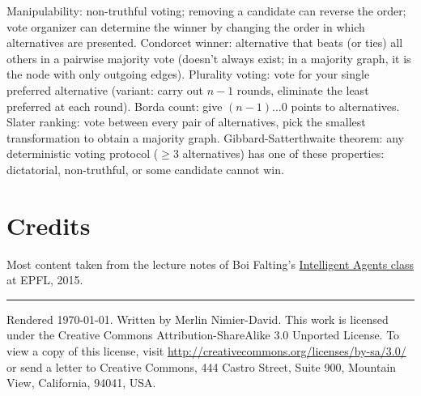 \documentclass[10pt,a4paper,landscape]{article}
\newcommand{\concept}[1]{\textcolor{Emerald}{#1}} %
\begin{document}
\begin{multicols*}{4}
\concept{Manipulability}: non-truthful voting; removing a candidate can reverse the order; vote organizer can determine the winner by changing the order in which alternatives are presented.
\concept{Condorcet winner}: alternative that beats (or ties) all others in a pairwise majority vote (doesn't always exist; in a majority graph, it is the node with only outgoing edges).
\concept{Plurality voting}: vote for your single preferred alternative (variant: carry out $n - 1$ rounds, eliminate the least preferred at each round).
\concept{Borda count}: give $(n - 1) \dots 0$ points to alternatives.
\concept{Slater ranking}: vote between every pair of alternatives, pick the smallest transformation to obtain a majority graph.
\concept{Gibbard-Satterthwaite theorem}: any deterministic voting protocol ($\geq 3$ alternatives) has one of these properties: dictatorial, non-truthful, or some candidate cannot win.

\newpage



\section{Credits}
Most content taken from the lecture notes of Boi Falting's \href{http://edu.epfl.ch/coursebook/en/intelligent-agents-CS-430}{Intelligent Agents class} at EPFL, 2015.

\vspace{0.5cm}
\hrule
\vspace{0.5cm}
\tiny
Rendered \today. Written by Merlin Nimier-David.
This work is licensed under the Creative Commons Attribution-ShareAlike 3.0 Unported License.
To view a copy of this license, visit \href{http://creativecommons.org/licenses/by-sa/3.0/}{http://creativecommons.org/licenses/by-sa/3.0/} or
send a letter to Creative Commons, 444 Castro Street, Suite 900, Mountain View, California, 94041, USA.
\end{multicols*}
\end{document}
